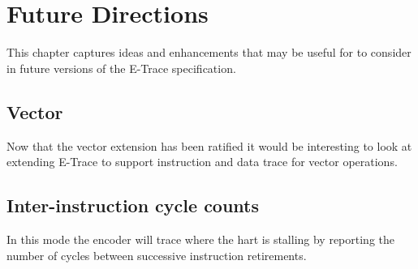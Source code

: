 \chapter{Future Directions} \label{futureIdeas}

This chapter captures ideas and enhancements that may be useful for to consider in future versions of the E-Trace specification.


\section{Vector}

Now that the vector extension has been ratified it would be interesting to look at extending E-Trace to support instruction and data trace for vector operations.

\section{Inter-instruction cycle counts}

In this mode the encoder will trace where the hart is stalling by
reporting the number of cycles between successive instruction
retirements.



